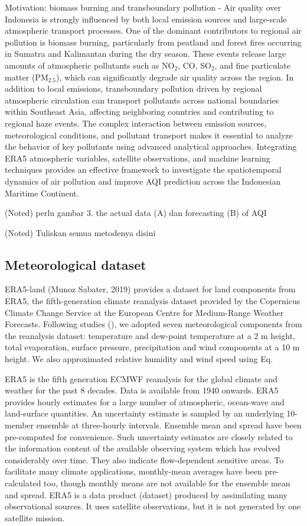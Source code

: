 \documentclass[pdflatex,sn-mathphys-num]{sn-jnl}%
\theoremstyle{thmstyleone}%
\theoremstyle{thmstyletwo}%
\theoremstyle{thmstylethree}%
\begin{document}
Motivation: biomass burning and transboundary pollution - Air quality over Indonesia is strongly influenced by both local emission sources and large-scale atmospheric transport processes. One of the dominant contributors to regional air pollution is biomass burning, particularly from peatland and forest fires occurring in Sumatra and Kalimantan during the dry season. These events release large amounts of atmospheric pollutants such as NO$_2$, CO, SO$_2$, and fine particulate matter (PM$_{2.5}$), which can significantly degrade air quality across the region. In addition to local emissions, transboundary pollution driven by regional atmospheric circulation can transport pollutants across national boundaries within Southeast Asia, affecting neighboring countries and contributing to regional haze events. The complex interaction between emission sources, meteorological conditions, and pollutant transport makes it essential to analyze the behavior of key pollutants using advanced analytical approaches. Integrating ERA5 atmospheric variables, satellite observations, and machine learning techniques provides an effective framework to investigate the spatiotemporal dynamics of air pollution and improve AQI prediction across the Indonesian Maritime Continent.


(Noted) perlu gambar 3. the actual data (A) dan forecasting (B) of AQI

(Noted) Tuliskan semua metodenya disini

\subsection{Meteorological dataset}
ERA5-land (Munoz Sabater, 2019) provides a dataset for land components from ERA5, the fifth-generation climate reanalysis dataset provided by the Copernicus Climate Change Service at the European Centre for Medium-Range Weather Forecasts. Following studies (), we adopted seven meteorological components from the reanalysis dataset: temperature and dew-point temperature at a 2 m height, total evaporation, surface pressure, precipitation and wind components at a 10 m height. We also approximated relative humidity and wind speed using Eq.

ERA5 is the fifth generation ECMWF reanalysis for the global climate and weather for the past 8 decades. Data is available from 1940 onwards. ERA5 provides hourly estimates for a large number of atmospheric, ocean-wave and land-surface quantities. An uncertainty estimate is sampled by an underlying 10-member ensemble at three-hourly intervals. Ensemble mean and spread have been pre-computed for convenience. Such uncertainty estimates are closely related to the information content of the available observing system which has evolved considerably over time. They also indicate flow-dependent sensitive areas. To facilitate many climate applications, monthly-mean averages have been pre-calculated too, though monthly means are not available for the ensemble mean and spread.
ERA5 is a data product (dataset) produced by assimilating many observational sources. It uses satellite observations, but it is not generated by one satellite mission.
\end{document}
